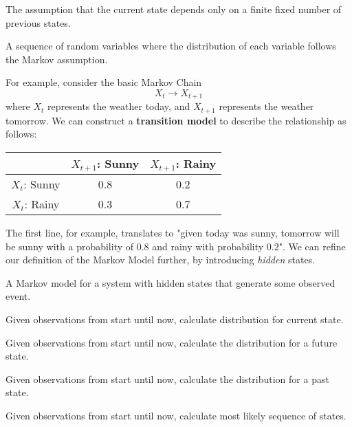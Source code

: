 \begin{definition}
	The assumption that the current state depends only on a finite fixed number of previous states.
\end{definition}

\begin{definition}
	A sequence of random variables where the distribution of each variable follows the Markov assumption.
\end{definition}

For example, consider the basic Markov Chain
\[
	X_t \to X_{t+1}
\]
where \(X_t\) represents the weather today, and \(X_{t+1}\) represents the weather tomorrow. We can construct a \textbf{transition model} to describe the relationship as follows:

\begin{table}[H]
	\centering
	\begin{tabular}{|c|c|c|}
		\hline
			 & \(X_{t+1}\): Sunny & \(X_{t+1}\): Rainy \\
		\hline
			\(X_t\): Sunny & 0.8 & 0.2  \\
			\(X_t\): Rainy & 0.3 & 0.7  \\
		\hline
	\end{tabular}
\end{table}

The first line, for example, translates to "given today was sunny, tomorrow will be sunny with a probability of 0.8 and rainy with probability 0.2". We can refine our definition of the Markov Model further, by introducing \emph{hidden} states.

\begin{definition}
	A Markov model for a system with hidden states that generate some observed event.
\end{definition}

\begin{definition}[Filtering]
	Given observations from start until now, calculate distribution for current state.
\end{definition}

\begin{definition}[Prediction]
	Given observations from start until now, calculate the distribution for a future state.
\end{definition}

\begin{definition}[Smoothing]
	Given observations from start until now, calculate the distribution for a past state.	
\end{definition}

\begin{definition}
	Given observations from start until now, calculate most likely sequence of states.
\end{definition}